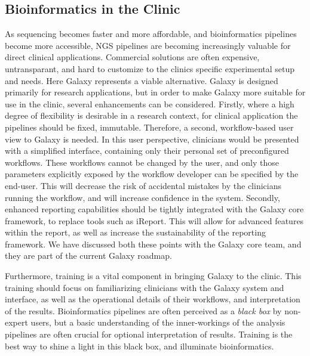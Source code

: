 \subsection{Bioinformatics in the Clinic}
As sequencing becomes faster and more affordable, and bioinformatics pipelines become more accessible, NGS pipelines are becoming increasingly valuable for direct clinical applications.
Commercial solutions are often expensive, untransparant, and hard to customize to the clinics specific experimental setup and needs. Here Galaxy represents a viable alternative. Galaxy is designed primarily for research applications, but in order to make Galaxy more suitable for use in the clinic, several enhancements can be considered.
Firstly, where a high degree of flexibility is desirable in a research context, for clinical application the pipelines should be fixed, immutable.
Therefore, a second, workflow-based user view to Galaxy is needed. In this user perspective, clinicians would be presented with a simplified interface, containing only their personal set of preconfigured workflows.
These workflows cannot be changed by the user, and only those parameters explicitly exposed by the workflow developer can be specified by the end-user. This will decrease the risk of accidental mistakes by the clinicians running the workflow, and will increase confidence in the system.
Secondly, enhanced reporting capabilities should be tightly integrated with the Galaxy core framework, to replace tools such as iReport.
This will allow for advanced features within the report, as well as increase the sustainability of the reporting framework.
We have discussed both these points with the Galaxy core team, and they are part of the current Galaxy roadmap.

Furthermore, training is a vital component in bringing Galaxy to the clinic. This training should focus on familiarizing clinicians with the Galaxy system and interface, as well as the operational details of their workflows, and interpretation of the results. Bioinformatics pipelines  are often perceived as a \emph{black box} by non-expert users, but a basic understanding of the inner-workings of the analysis pipelines are often crucial for optional interpretation of results. Training is the best way to shine a light in this black box, and illuminate bioinformatics.


